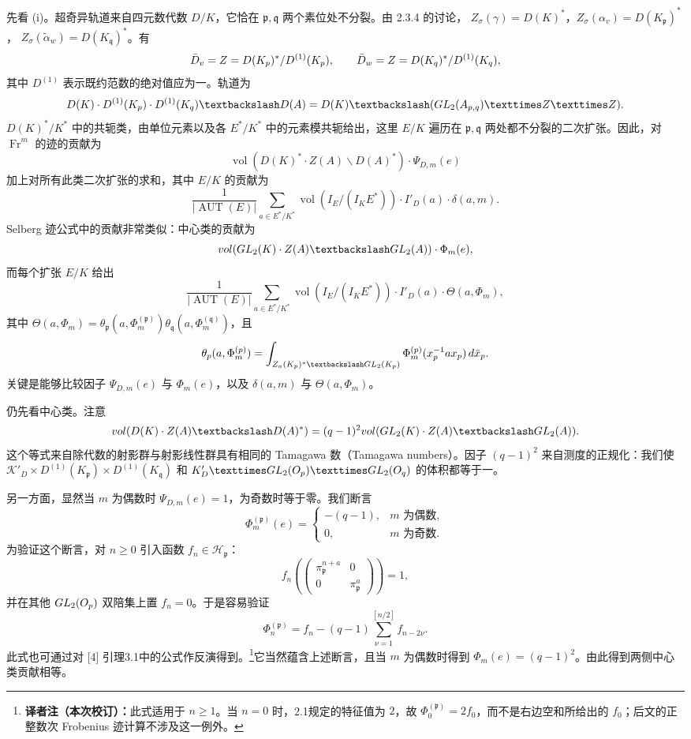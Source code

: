 先看 (i)。超奇异轨道来自四元数代数 $D/K$，它恰在 $\mathfrak p,\mathfrak q$ 两个素位处不分裂。由 2.3.4 的讨论，
$Z_\sigma(\gamma)=D(K)^*$，$Z_\sigma(\alpha_v)=D(K_{\mathfrak p})^*$，
$Z_\sigma(\widetilde\alpha_w)=D(K_{\mathfrak q})^*$。有
\[
\bar D_v=Z=D(K_{p})^*/D^{(1)}(K_{p}),\qquad
\bar D_w=Z=D(K_{q})^*/D^{(1)}(K_{q}),
\]
其中 $D^{(1)}$ 表示既约范数的绝对值应为一。轨道为
\[
D(K)\cdot D^{(1)}(K_{\mathfrak p})\cdot D^{(1)}(K_{\mathfrak q})\backslash D(A)
=D(K)\backslash(\GL_2(A_{\mathfrak p,\mathfrak q})\times\Z\times\Z).
\]
$D(K)^*/K^*$ 中的共轭类，由单位元素以及各 $E^*/K^*$ 中的元素模共轭给出，这里 $E/K$ 遍历在 $\mathfrak p,\mathfrak q$ 两处都不分裂的二次扩张。因此，对 $\operatorname{Fr}^m$ 的迹的贡献为
\[
\operatorname{vol}(D(K)^*\cdot Z(A)\backslash D(A)^*)\cdot\Psi_{D,m}(e)
\]
加上对所有此类二次扩张的求和，其中 $E/K$ 的贡献为
\[
\frac1{|\operatorname{AUT}(E)|}
\sum_{a\in E^*/K^*}\operatorname{vol}(I_E/(I_KE^*))\cdot I'_D(a)\cdot\delta(a,m).
\]
Selberg 迹公式中的贡献非常类似：中心类的贡献为
\[
\operatorname{vol}(\GL_2(K)\cdot Z(A)\backslash\GL_2(A))\cdot\Phi_m(e),
\]
而每个扩张 $E/K$ 给出
\[
\frac1{|\operatorname{AUT}(E)|}
\sum_{a\in E^*/K^*}\operatorname{vol}(I_E/(I_KE^*))\cdot I'_D(a)\cdot\Theta(a,\Phi_m),
\]
其中
$\Theta(a,\Phi_m)=\theta_{\mathfrak p}(a,\Phi_m^{(\mathfrak p)})
\theta_{\mathfrak q}(a,\Phi_m^{(\mathfrak q)})$，且
\[
\theta_{\mathfrak p}(a,\Phi_m^{(\mathfrak p)})
=\int_{Z_a(K_{\mathfrak p})^*\backslash\GL_2(K_{\mathfrak p})}
\Phi_m^{(\mathfrak p)}(x_{\mathfrak p}^{-1}ax_{\mathfrak p})\,d\bar x_{\mathfrak p}.
\]
关键是能够比较因子 $\Psi_{D,m}(e)$ 与 $\Phi_m(e)$，以及
$\delta(a,m)$ 与 $\Theta(a,\Phi_m)$。

仍先看中心类。注意
\[
\operatorname{vol}(D(K)\cdot Z(A)\backslash D(A)^*)
=(q-1)^2\operatorname{vol}(\GL_2(K)\cdot Z(A)\backslash\GL_2(A)).
\]
这个等式来自除代数的射影群与射影线性群具有相同的 Tamagawa 数（Tamagawa numbers）。因子 $(q-1)^2$ 来自测度的正规化：我们使
$\mathcal K'_D\times D^{(1)}(K_{\mathfrak p})\times D^{(1)}(K_{\mathfrak q})$
和 $\mathcal K'_D\times\GL_2(\mathcal O_{\mathfrak p})\times\GL_2(\mathcal O_{\mathfrak q})$
的体积都等于一。

另一方面，显然当 $m$ 为偶数时 $\Psi_{D,m}(e)=1$，为奇数时等于零。我们断言
\[
\Phi_m^{(\mathfrak p)}(e)=
\begin{cases}-(q-1),&m\text{ 为偶数},\\0,&m\text{ 为奇数}.\end{cases}
\]
为验证这个断言，对 $n\geq0$ 引入函数 $f_n\in\mathcal H_{\mathfrak p}$：
\[
f_n\left(\begin{pmatrix}\pi_{\mathfrak p}^{n+a}&0\\0&\pi_{\mathfrak p}^a\end{pmatrix}\right)=1,
\]
并在其他 $GL_2(O_{p})$ 双陪集上置 $f_n=0$。于是容易验证
\[
\Phi_n^{(\mathfrak p)}=f_n-(q-1)\sum_{\nu=1}^{[n/2]}f_{n-2\nu}.
\]
此式也可通过对 [4] 引理3.1中的公式作反演得到。\footnote{\textbf{译者注（本次校订）：}此式适用于 $n\geq1$。当 $n=0$ 时，2.1规定的特征值为 $2$，故 $\Phi_0^{(\mathfrak p)}=2f_0$，而不是右边空和所给出的 $f_0$；后文的正整数次 Frobenius 迹计算不涉及这一例外。}它当然蕴含上述断言，且当 $m$ 为偶数时得到
$\Phi_m(e)=(q-1)^2$。由此得到两侧中心类贡献相等。

